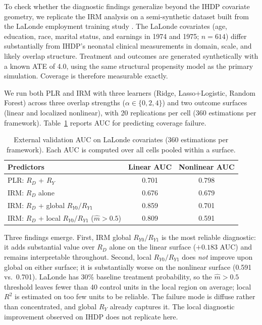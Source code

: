 \documentclass[12pt]{article}
\begin{document}
To check whether the diagnostic findings generalize beyond the IHDP covariate geometry, we replicate the IRM analysis on a semi-synthetic dataset built from the LaLonde employment training study \citep{LaLonde1986}. The LaLonde covariates (age, education, race, marital status, and earnings in 1974 and 1975; $n = 614$) differ substantially from IHDP's neonatal clinical measurements in domain, scale, and likely overlap structure. Treatment and outcomes are generated synthetically with a known ATE of 4.0, using the same structural propensity model as the primary simulation. Coverage is therefore measurable exactly.

We run both PLR and IRM with three learners (Ridge, Lasso+Logistic, Random Forest) across three overlap strengths ($\alpha \in \{0, 2, 4\}$) and two outcome surfaces (linear and localized nonlinear), with 20 replications per cell (360 estimations per framework). Table~\ref{tab:lalonde_auc} reports AUC for predicting coverage failure.

\begin{table}[h!]
\centering
\caption{External validation AUC on LaLonde covariates (360 estimations per framework). Each AUC is computed over all cells pooled within a surface.}
\label{tab:lalonde_auc}
\begin{tabular}{lcc}
\toprule
\textbf{Predictors} & \textbf{Linear AUC} & \textbf{Nonlinear AUC} \\
\midrule
PLR: $R_D$ + $R_Y$                                 & 0.701 & 0.798 \\
\midrule
IRM: $R_D$ alone                                   & 0.676 & 0.679 \\
IRM: $R_D$ + global $R_{Y0} / R_{Y1}$              & 0.859 & 0.701 \\
IRM: $R_D$ + local $R_{Y0} / R_{Y1}$ ($\hat{m}>0.5$) & 0.809 & 0.591 \\
\bottomrule
\end{tabular}
\end{table}

Three findings emerge. First, IRM global $R_{Y0}/R_{Y1}$ is the most reliable diagnostic: it adds substantial value over $R_D$ alone on the linear surface ($+0.183$ AUC) and remains interpretable throughout. Second, local $R_{Y0}/R_{Y1}$ does \emph{not} improve upon global on either surface; it is substantially worse on the nonlinear surface (0.591 vs.\ 0.701). LaLonde has 30\% baseline treatment probability, so the $\hat{m}>0.5$ threshold leaves fewer than 40 control units in the local region on average; local $R^2$ is estimated on too few units to be reliable. The failure mode is diffuse rather than concentrated, and global $R_Y$ already captures it. The local diagnostic improvement observed on IHDP does not replicate here.
\end{document}

